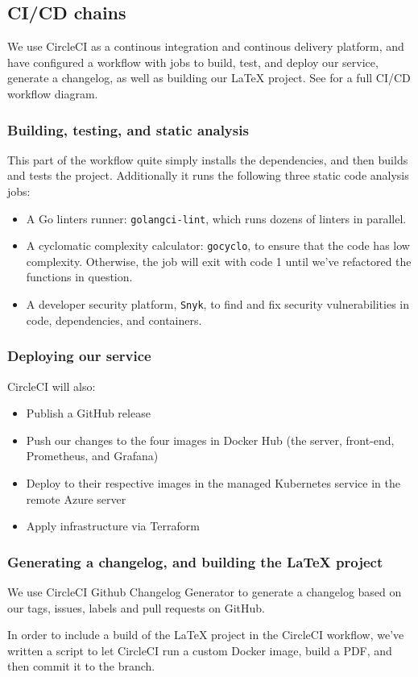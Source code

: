 \subsection{CI/CD chains}

We use CircleCI as a continous integration and continous delivery platform, and have configured a workflow \cite{workflow:circleci} with jobs to build, test, and deploy our service, generate a changelog, as well as building our LaTeX project. See  for a full CI/CD workflow diagram.


\subsubsection{Building, testing, and static analysis}

This part of the workflow quite simply installs the dependencies, and then builds and tests the project. Additionally it runs the following three static code analysis jobs:
\begin{itemize}
    \item A Go linters runner: \texttt{golangci-lint}, which runs dozens of linters in parallel.
    \item A cyclomatic complexity calculator: \texttt{gocyclo}, to ensure that the code has low complexity. Otherwise, the job will exit with code 1 until we've refactored the functions in question.
    \item A developer security platform, \texttt{Snyk}, to find and fix security vulnerabilities in code, dependencies, and containers.
\end{itemize}


\subsubsection{Deploying our service}

CircleCI will also:
\begin{itemize}
    \item Publish a GitHub release
    \item Push our changes to the four images in Docker Hub (the server, front-end, Prometheus, and Grafana)
    \item Deploy to their respective images in the managed Kubernetes service in the remote Azure server
    \item Apply infrastructure via Terraform
\end{itemize}


\subsubsection{Generating a changelog, and building the LaTeX project}

We use CircleCI Github Changelog Generator \cite{tool:changelog-generator} to generate a changelog based on our tags, issues, labels and pull requests on GitHub.

In order to include a build of the LaTeX project in the CircleCI workflow, we've written a script to let CircleCI run a custom Docker image, build a PDF, and then commit it to the branch.
